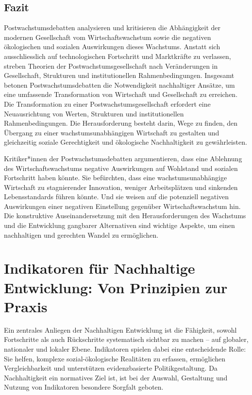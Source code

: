 \documentclass[
  nswissgerman,
  a4paper,
  DIV=11,
  numbers=noendperiod,
  oneside,
  openany]{scrreprt}
\begin{document}
\subsection{Fazit}\label{fazit-4}

Postwachstumsdebatten analysieren und kritisieren die Abhängigkeit der
modernen Gesellschaft vom Wirtschaftswachstum sowie die negativen
ökologischen und sozialen Auswirkungen dieses Wachstums. Anstatt sich
ausschliesslich auf technologischen Fortschritt und Marktkräfte zu
verlassen, streben Theorien der Postwachstumsgesellschaft nach
Veränderungen in Gesellschaft, Strukturen und institutionellen
Rahmenbedingungen. Insgesamt betonen Postwachstumsdebatten die
Notwendigkeit nachhaltiger Ansätze, um eine umfassende Transformation
von Wirtschaft und Gesellschaft zu erreichen. Die Transformation zu
einer Postwachstumsgesellschaft erfordert eine Neuausrichtung von
Werten, Strukturen und institutionellen Rahmenbedingungen. Die
Herausforderung besteht darin, Wege zu finden, den Übergang zu einer
wachstumsunabhängigen Wirtschaft zu gestalten und gleichzeitig soziale
Gerechtigkeit und ökologische Nachhaltigkeit zu gewährleisten.

Kritiker*innen der Postwachstumsdebatten argumentieren, dass eine
Ablehnung des Wirtschaftswachstums negative Auswirkungen auf Wohlstand
und sozialen Fortschritt haben könnte. Sie befürchten, dass eine
wachstumsunabhängige Wirtschaft zu stagnierender Innovation, weniger
Arbeitsplätzen und sinkenden Lebensstandards führen könnte. Und sie
weisen auf die potenziell negativen Auswirkungen einer negativen
Einstellung gegenüber Wirtschaftswachstum hin. Die konstruktive
Auseinandersetzung mit den Herausforderungen des Wachstums und die
Entwicklung gangbarer Alternativen sind wichtige Aspekte, um einen
nachhaltigen und gerechten Wandel zu ermöglichen.

\section{Indikatoren für Nachhaltige Entwicklung: Von Prinzipien zur
Praxis}\label{indikatoren-fuxfcr-nachhaltige-entwicklung-von-prinzipien-zur-praxis}

Ein zentrales Anliegen der Nachhaltigen Entwicklung ist die Fähigkeit,
sowohl Fortschritte als auch Rückschritte systematisch sichtbar zu
machen -- auf globaler, nationaler und lokaler Ebene. Indikatoren
spielen dabei eine entscheidende Rolle: Sie helfen, komplexe
sozial-ökologische Realitäten zu erfassen, ermöglichen Vergleichbarkeit
und unterstützen evidenzbasierte Politikgestaltung. Da Nachhaltigkeit
ein normatives Ziel ist, ist bei der Auswahl, Gestaltung und Nutzung von
Indikatoren besondere Sorgfalt geboten.
\end{document}
